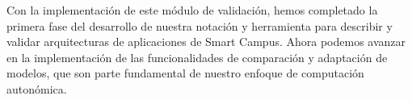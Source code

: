 Con la implementación de este módulo de validación, hemos completado la primera fase del desarrollo de nuestra notación y herramienta para describir y validar arquitecturas de aplicaciones de Smart Campus. Ahora podemos avanzar en la implementación de las funcionalidades de comparación y adaptación de modelos, que son parte fundamental de nuestro enfoque de computación autonómica. 


